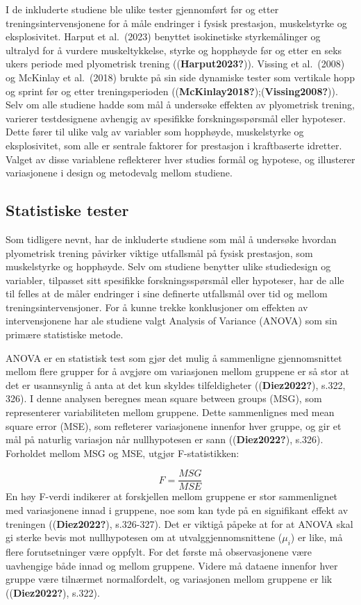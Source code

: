 \documentclass[
  letterpaper,
  DIV=11,
  numbers=noendperiod]{scrreprt}
\begin{document}
I de inkluderte studiene ble ulike tester gjennomført før og etter
treningsintervensjonene for å måle endringer i fysisk prestasjon,
muskelstyrke og eksplosivitet. Harput et al.~(2023) benyttet
isokinetiske styrkemålinger og ultralyd for å vurdere muskeltykkelse,
styrke og hopphøyde før og etter en seks ukers periode med plyometrisk
trening ((\textbf{Harput2023?})). Vissing et al.~(2008) og McKinlay et
al.~(2018) brukte på sin side dynamiske tester som vertikale hopp og
sprint før og etter treningsperioden
((\textbf{McKinlay2018?});(\textbf{Vissing2008?})). Selv om alle
studiene hadde som mål å undersøke effekten av plyometrisk trening,
varierer testdesignene avhengig av spesifikke forskningsspørsmål eller
hypoteser. Dette fører til ulike valg av variabler som hopphøyde,
muskelstyrke og eksplosivitet, som alle er sentrale faktorer for
prestasjon i kraftbaserte idretter. Valget av disse variablene
reflekterer hver studies formål og hypotese, og illusterer variasjonene
i design og metodevalg mellom studiene.

\subsection{Statistiske tester}\label{statistiske-tester}

Som tidligere nevnt, har de inkluderte studiene som mål å undersøke
hvordan plyometrisk trening påvirker viktige utfallsmål på fysisk
prestasjon, som muskelstyrke og hopphøyde. Selv om studiene benytter
ulike studiedesign og variabler, tilpasset sitt spesifikke
forskningsspørsmål eller hypoteser, har de alle til felles at de måler
endringer i sine definerte utfallsmål over tid og mellom
treningsintervensjoner. For å kunne trekke konklusjoner om effekten av
intervensjonene har ale studiene valgt Analysis of Variance (ANOVA) som
sin primære statistiske metode.

ANOVA er en statistisk test som gjør det mulig å sammenligne
gjennomsnittet mellom flere grupper for å avgjøre om variasjonen mellom
gruppene er så stor at det er usannsynlig å anta at det kun skyldes
tilfeldigheter ((\textbf{Diez2022?}), s.322, 326). I denne analysen
beregnes mean square between groups (MSG), som representerer
variabiliteten mellom gruppene. Dette sammenlignes med mean square error
(MSE), som refleterer variasjonene innenfor hver gruppe, og gir et mål
på naturlig variasjon når nullhypotesen er sann ((\textbf{Diez2022?}),
s.326). Forholdet mellom MSG og MSE, utgjør F-statistikken:

\[
F = \frac{MSG}{MSE}
\] En høy F-verdi indikerer at forskjellen mellom gruppene er stor
sammenlignet med variasjonene innad i gruppene, noe som kan tyde på en
signifikant effekt av treningen ((\textbf{Diez2022?}), s.326-327). Det
er viktigå påpeke at for at ANOVA skal gi sterke bevis mot nullhypotesen
om at utvalggjennomsnittene (\(\mu_i\)) er like, må flere forutsetninger
være oppfylt. For det første må observasjonene være uavhengige både
innad og mellom gruppene. Videre må dataene innenfor hver gruppe være
tilnærmet normalfordelt, og variasjonen mellom gruppene er lik
((\textbf{Diez2022?}), s.322).
\end{document}
